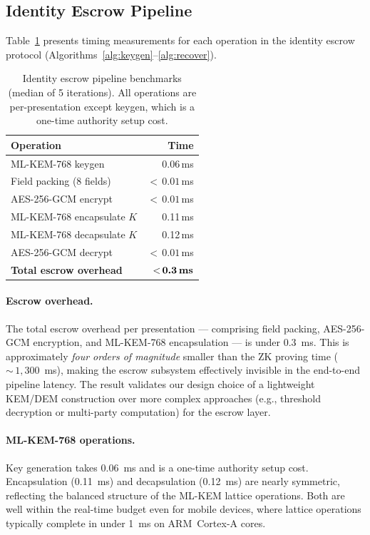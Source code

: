 \subsection{Identity Escrow Pipeline}\label{sec:bench-escrow}

Table~\ref{tab:escrow-bench} presents timing measurements for each operation in the identity escrow protocol (Algorithms~\ref{alg:keygen}--\ref{alg:recover}).

\begin{table}[t]
  \centering
  \caption{Identity escrow pipeline benchmarks (median of 5 iterations).
           All operations are per-presentation except keygen, which is a one-time authority setup cost.}\label{tab:escrow-bench}
  \begin{tabular}{lr}
    \toprule
    Operation & Time \\
    \midrule
    ML-KEM-768 keygen            & 0.06\,ms \\
    Field packing (8 fields)     & ${<}\,0.01$\,ms \\
    AES-256-GCM encrypt          & ${<}\,0.01$\,ms \\
    ML-KEM-768 encapsulate $K$   & 0.11\,ms \\
    ML-KEM-768 decapsulate $K$   & 0.12\,ms \\
    AES-256-GCM decrypt          & ${<}\,0.01$\,ms \\
    \midrule
    \textbf{Total escrow overhead} & ${<}\,\textbf{0.3\,ms}$ \\
    \bottomrule
  \end{tabular}
\end{table}

\paragraph{Escrow overhead.}
The total escrow overhead per presentation --- comprising field packing, AES-256-GCM encryption, and ML-KEM-768 encapsulation --- is under 0.3~ms.
This is approximately \emph{four orders of magnitude} smaller than the ZK proving time (${\sim}\,1{,}300$~ms), making the escrow subsystem effectively invisible in the end-to-end pipeline latency.
The result validates our design choice of a lightweight KEM/DEM construction over more complex approaches (e.g., threshold decryption or multi-party computation) for the escrow layer.

\paragraph{ML-KEM-768 operations.}
Key generation takes 0.06~ms and is a one-time authority setup cost.
Encapsulation (0.11~ms) and decapsulation (0.12~ms) are nearly symmetric, reflecting the balanced structure of the ML-KEM lattice operations.
Both are well within the real-time budget even for mobile devices, where lattice operations typically complete in under 1~ms on ARM~Cortex-A cores.


